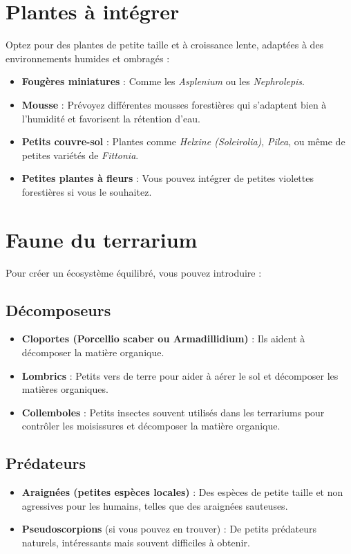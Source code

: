 \section{Plantes à intégrer}
Optez pour des plantes de petite taille et à croissance lente, adaptées à des environnements humides et ombragés :
\begin{itemize}
    \item \textbf{Fougères miniatures} : Comme les \textit{Asplenium} ou les \textit{Nephrolepis}.
    \item \textbf{Mousse} : Prévoyez différentes mousses forestières qui s'adaptent bien à l'humidité et favorisent la rétention d'eau.
    \item \textbf{Petits couvre-sol} : Plantes comme \textit{Helxine (Soleirolia)}, \textit{Pilea}, ou même de petites variétés de \textit{Fittonia}.
    \item \textbf{Petites plantes à fleurs} : Vous pouvez intégrer de petites violettes forestières si vous le souhaitez.
\end{itemize}

\section{Faune du terrarium}
Pour créer un écosystème équilibré, vous pouvez introduire :

\subsection{Décomposeurs}
\begin{itemize}
    \item \textbf{Cloportes (Porcellio scaber ou Armadillidium)} : Ils aident à décomposer la matière organique.
    \item \textbf{Lombrics} : Petits vers de terre pour aider à aérer le sol et décomposer les matières organiques.
    \item \textbf{Collemboles} : Petits insectes souvent utilisés dans les terrariums pour contrôler les moisissures et décomposer la matière organique.
\end{itemize}

\subsection{Prédateurs}
\begin{itemize}
    \item \textbf{Araignées (petites espèces locales)} : Des espèces de petite taille et non agressives pour les humains, telles que des araignées sauteuses.
    \item \textbf{Pseudoscorpions} (si vous pouvez en trouver) : De petits prédateurs naturels, intéressants mais souvent difficiles à obtenir.
\end{itemize}


